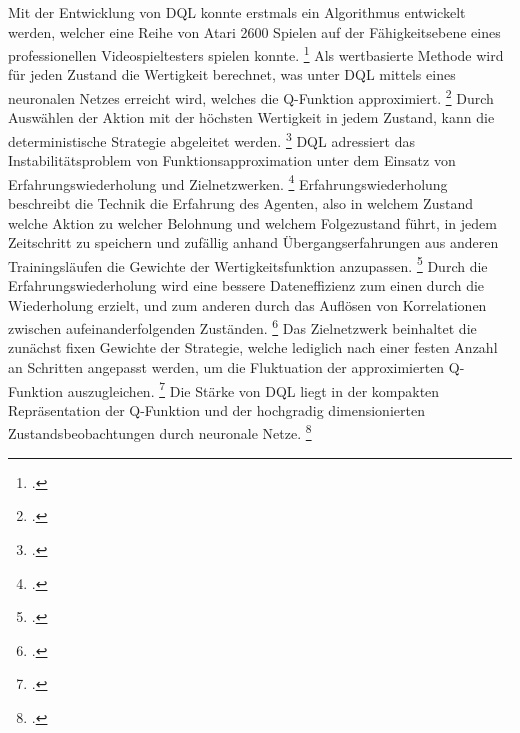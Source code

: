 Mit der Entwicklung von DQL konnte erstmals ein Algorithmus entwickelt werden, welcher eine Reihe von Atari 2600 Spielen auf der Fähigkeitsebene eines professionellen Videospieltesters spielen konnte. \footcite[Vgl.][S. 6]{Arulkumaran.2017}
Als wertbasierte Methode wird für jeden Zustand die Wertigkeit berechnet, was unter DQL mittels eines neuronalen Netzes erreicht wird, welches die Q-Funktion approximiert. \footcite[Vgl.][S. 4]{Huang.2017}
Durch Auswählen der Aktion mit der höchsten Wertigkeit in jedem Zustand, kann die deterministische Strategie abgeleitet werden. \footcite[Vgl.][S. 4]{Huang.2017}
DQL adressiert das Instabilitätsproblem von Funktionsapproximation unter dem Einsatz von Erfahrungswiederholung und Zielnetzwerken. \footcite[Vgl.][S. 7]{Arulkumaran.2017}
Erfahrungswiederholung beschreibt die Technik die Erfahrung des Agenten, also in welchem Zustand welche Aktion zu welcher Belohnung und welchem Folgezustand führt, in jedem Zeitschritt zu speichern und zufällig anhand Übergangserfahrungen aus anderen Trainingsläufen die Gewichte der Wertigkeitsfunktion anzupassen. \footcite[Vgl.][S. 4]{Mnih.2013}
Durch die Erfahrungswiederholung wird eine bessere Dateneffizienz zum einen durch die Wiederholung erzielt, und zum anderen durch das Auflösen von Korrelationen zwischen aufeinanderfolgenden Zuständen. \footcite[Vgl.][S. 4f.]{Mnih.2013}
Das Zielnetzwerk beinhaltet die zunächst fixen Gewichte der Strategie, welche lediglich nach einer festen Anzahl an Schritten angepasst werden, um die Fluktuation der approximierten Q-Funktion auszugleichen. \footcite[Vgl.][S. 7]{Arulkumaran.2017}
Die Stärke von DQL liegt in der kompakten Repräsentation der Q-Funktion und der hochgradig dimensionierten Zustandsbeobachtungen durch neuronale Netze. \footcite[Vgl.][S. 7]{Arulkumaran.2017}

